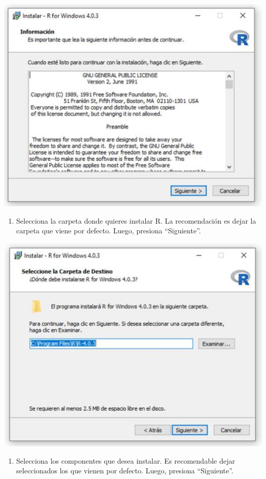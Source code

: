 \documentclass[
]{book}
\providecommand{\tightlist}{%
  \setlength{\itemsep}{0pt}\setlength{\parskip}{0pt}}
\begin{document}
\includegraphics{data/08.png}

\begin{enumerate}
\def\labelenumi{\arabic{enumi}.}
\setcounter{enumi}{8}
\tightlist
\item
  Selecciona la carpeta donde quieres instalar R. La recomendación es dejar la carpeta que viene por defecto. Luego, presiona ``Siguiente''.
\end{enumerate}

\includegraphics{data/09.png}

\begin{enumerate}
\def\labelenumi{\arabic{enumi}.}
\setcounter{enumi}{9}
\tightlist
\item
  Selecciona los componentes que desea instalar. Es recomendable dejar seleccionados los que vienen por defecto. Luego, presiona ``Siguiente''.
\end{enumerate}
\end{document}
